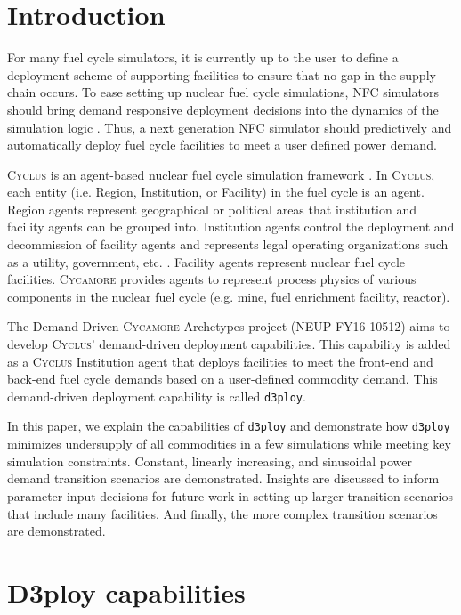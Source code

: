 \documentclass[11pt,letterpaper]{article}
\newcommand{\Cyclus}{\textsc{Cyclus}\xspace}%
\newcommand{\Cycamore}{\textsc{Cycamore}\xspace}%
\newcommand{\deploy}{\texttt{d3ploy}\xspace}%
\begin{document}
\section{Introduction}
For many fuel cycle simulators, it is currently up to the user 
to define a deployment scheme of supporting facilities to ensure 
that no gap in the supply chain occurs.
To ease setting up nuclear fuel cycle simulations, \gls{NFC}
simulators should bring demand responsive deployment decisions into 
the dynamics of the simulation logic \cite{huff_current_2017}. 
Thus, a next generation \gls{NFC} simulator should predictively and 
automatically deploy fuel cycle facilities to meet a user defined 
power demand. 

\Cyclus is an agent-based nuclear fuel cycle simulation framework 
\cite{huff_fundamental_2016}. 
In \Cyclus, each entity (i.e. Region, Institution, or Facility) in the 
fuel cycle is an agent. 
Region agents represent geographical or political areas that institution
and facility agents can be grouped into. 
Institution agents control the 
deployment and decommission of facility agents 
and represents legal operating organizations such as a 
utility, government, etc. \cite{huff_fundamental_2016}. 
Facility agents represent nuclear fuel cycle facilities. 
\Cycamore \cite{carlsen_cycamore_2014}
provides agents to represent process physics of various 
components in the nuclear fuel cycle (e.g. mine, fuel enrichment 
facility, reactor). 

The Demand-Driven \Cycamore Archetypes project (NEUP-FY16-10512) 
aims to develop \Cyclus' demand-driven deployment capabilities. 
This capability is added as a \Cyclus Institution
agent that deploys facilities to meet the front-end and back-end 
fuel cycle demands based on a user-defined commodity demand. 
This demand-driven deployment capability is called 
\deploy. 

In this paper, we explain the capabilities of \deploy and
demonstrate how \deploy minimizes undersupply of all 
commodities in a few simulations while meeting key simulation 
constraints. 
Constant, linearly increasing, and sinusoidal power demand
transition scenarios are demonstrated. 
Insights are discussed to inform parameter 
input decisions for future work in setting up 
larger transition scenarios that include many facilities.
And finally, the more complex transition scenarios are
demonstrated. 

\section{D3ploy capabilities}
\end{document}

